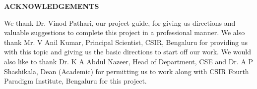 \vspace*{1cm}
{\centering \textbf{ACKNOWLEDGEMENTS}\\[1.5cm]}

We thank Dr. Vinod Pathari, our project guide, for giving us directions and
valuable suggestions to complete this project in a professional manner.
We also thank Mr. V Anil Kumar, Principal Scientist, CSIR, Bengaluru for
providing us with this topic and giving us the basic directions to start off our
work. We would also like to thank Dr. K A Abdul Nazeer, Head of Department, CSE
and Dr. A P Shashikala, Dean (Academic) for permitting us to work along with
CSIR Fourth Paradigm Institute, Bengaluru for this project.
